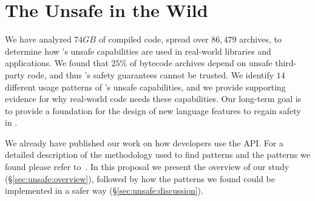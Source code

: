 


\newcommand{\hdr}{\rowcolor{header-color}}
\newcommand{\alt}{\rowcolor{alt-row-color}}
\newcommand{\row}{}

\newcommand{\javaclass}[1]{\emph{#1}}
\newcommand{\member}[1]{\emph{#1}}
\newcommand{\smugroup}[1]{\textsl{#1}}
\newcommand{\stackoverflow}{Stack Overflow}

\newcommand\namealloc{Allocate an Object without Invoking a Constructor}
\newcommand\nameprobyte{Process Byte Arrays in Block}
\newcommand\namelockfree{Atomic Operations}
\newcommand\namefence{Strongly Consistent Shared Variables}
\newcommand\namepark{Park/Unpark Threads}
\newcommand\namefinalfield{Update Final Fields}
\newcommand\namemonitor{Non-Lexically-Scoped Monitors}
\newcommand\nameserialization{Serialization/Deserialization}
\newcommand\namemarshalling{Foreign Data Access and Object Marshaling}
\newcommand\namethrow{Throw Checked Exceptions without Being Declared}
\newcommand\namesize{Get the Size of an Object or an Array}
\newcommand\namelargearrays{Large Arrays and Off-Heap Data Structures}
\newcommand\namepage{Get Memory Page Size}
\newcommand\nameclass{Load Class without Security Checks}

\chapter{The \java{} Unsafe \api{} in the Wild}
\label{cha:unsafe}

We have analyzed $74 GB$ of compiled  code,
spread over $86,479$  archives, to determine how 's unsafe capabilities are used in real-world libraries and applications.
We found that $25\%$ of  bytecode archives depend on unsafe third-party \java{} code, and thus \java{}'s safety guarantees cannot be trusted.
We identify $14$ different usage patterns of \java{}'s unsafe capabilities, and we provide supporting evidence for why real-world code needs these capabilities.
Our long-term goal is to provide a foundation for the design of new language features to regain safety in .

We already have published our work on how developers use the  API.
For a detailed description of the methodology used to find patterns and the patterns we found please refer to~\cite{mastrangeloUseYourOwn2015}.
In this proposal we present the overview of our study (\S\ref{sec:unsafe:overview}), followed by how the patterns we found could be implemented in a safer way (\S\ref{sec:unsafe:discussion}).


